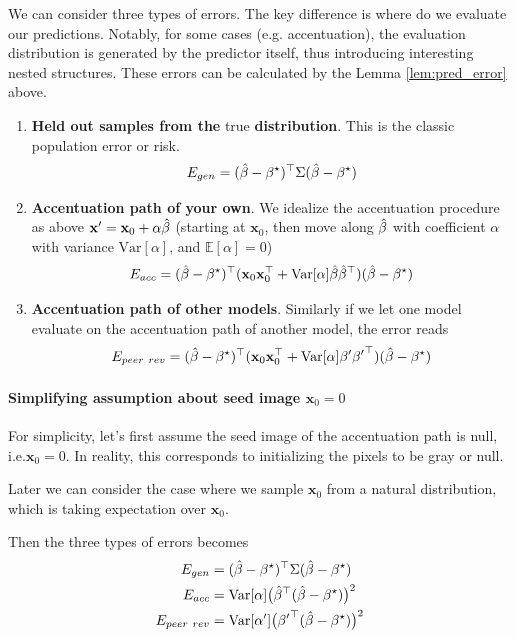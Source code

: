 We can consider three types of errors. The key difference is where
do we evaluate our predictions. Notably, for some cases (e.g. accentuation),
the evaluation distribution is generated by the predictor itself,
thus introducing interesting nested structures. These errors can be
calculated by the Lemma \ref{lem:pred_error} above.
\begin{enumerate}
\item \textbf{Held out samples from the }true\textbf{ distribution}. This
is the classic population error or risk.
\[
E_{gen}=(\hat{\beta}-{\beta^{\star}})^{\top}\Sigma(\hat{\beta}-{\beta^{\star}})
\]
\item \textbf{Accentuation path of your own}. We idealize the accentuation
procedure as above $\mathbf{x}^{\prime}=\mathbf{x}_{0}+\alpha\hat{\beta}$
(starting at $\mathbf{x}_{0}$, then move along $\hat{\beta}$ with
coefficient $\alpha$ with variance $\mathrm{Var}[\alpha]$, and $\mathbb{E}[\alpha]=0$)
\[
E_{acc}=(\hat{\beta}-{\beta^{\star}})^{\top}(\mathbf{x}_{0}\mathbf{x}_{0}^{\top}+\mathrm{Var}[\alpha]\hat{\beta}{\hat{\beta}}^{\top})(\hat{\beta}-{\beta^{\star}})
\]
\item \textbf{Accentuation path of other models}. Similarly if we let one
model evaluate on the accentuation path of another model, the error
reads
\[
E_{peer\ rev}=(\bhat-\bstar)^{\top}(\mathbf{x}_{0}\mathbf{x}_{0}^{\top}+\mathrm{Var}[\alpha]\bprime{\bprime}^{\top})(\bhat-\bstar)
\]
\end{enumerate}

\paragraph{Simplifying assumption about seed image $\mathbf{x}_{0}=0$}

For simplicity, let's first assume the seed image of the accentuation
path is null, i.e.$\mathbf{x}_{0}=0$. In reality, this corresponds
to initializing the pixels to be gray or null.

Later we can consider the case where we sample $\mathbf{x}_{0}$ from
a natural distribution, which is taking expectation over $\mathbf{x}_{0}$.

Then the three types of errors becomes
\begin{align*}
E_{gen} & =(\hat{\beta}-{\beta^{\star}})^{\top}\Sigma(\hat{\beta}-{\beta^{\star}})\\
E_{acc} & =\mathrm{Var}[\alpha]\big({\hat{\beta}}^{\top}(\hat{\beta}-{\beta^{\star}})\big)^{2}\\
E_{peer\ rev} & =\mathrm{Var}[\alpha^{\prime}]\big({{\beta^{\prime}}}^{\top}(\hat{\beta}-{\beta^{\star}})\big)^{2}
\end{align*}

